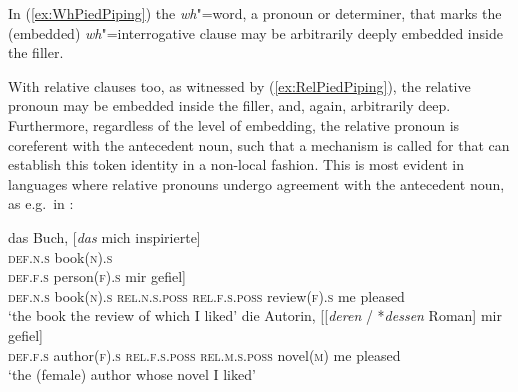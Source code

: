 \documentclass[output=paper
,notxmath 
 	        ,biblatex
                ,babelshorthands
                ,newtxmath
                ,draftmode
                ,colorlinks, citecolor=brown
]{langscibook}
\begin{document}
\begin{exe}
  \ex \label{ex:WhPiedPiping}
  \begin{xlist}
  \end{xlist}
\end{exe}

\begin{exe}
  \ex \label{ex:RelPiedPiping}
  \begin{xlist}
  \end{xlist}
\end{exe}

\noindent
In (\ref{ex:WhPiedPiping}) the \emph{wh}"=word, a pronoun or determiner, that
marks the (embedded) \emph{wh}"=interrogative clause may be arbitrarily deeply embedded inside the filler.  

With relative clauses too, as witnessed by (\ref{ex:RelPiedPiping}), the
relative pronoun may be embedded inside the filler, and, again,
arbitrarily deep. Furthermore, regardless of the level of embedding,
the relative pronoun is coreferent with the antecedent noun, such that
a mechanism is called for that can establish this token identity in a
non-local fashion. This is most evident in languages where relative
pronouns undergo agreement with the antecedent noun, as e.g.\ in
:

\eal
\ex
\gll das Buch, [\textit{das} mich inspirierte]\\
     \textsc{def.n.s} book(\textsc{n})\textsc{.s} \hphantom[\textsc{rel.n.s} me inspired\\
\glt `the book that inspired me'
\ex
\gll die Person, [\textit{die} mich inspirierte]\\
     \textsc{def.f.s} person(\textsc{f})\textsc{.s} \hphantom[\textsc{rel.f.s} me inspired\\   
\glt `the person that inspired me'
\ex
\gll das Buch, [[\textit{dessen} / *\textit{deren} Rezension] mir gefiel]\\
     \textsc{def.n.s} book(\textsc{n})\textsc{.s} \hphantom{[[}\textsc{rel.n.s.poss} {} \hphantom{*}\textsc{rel.f.s.poss} review(\textsc{f}).\textsc{s} me pleased\\
\glt `the book the review of which I liked'
\ex
\gll die Autorin, [[\textit{deren} / *\textit{dessen} Roman] mir gefiel]\\
     \textsc{def.f.s} author(\textsc{f})\textsc{.s} \hphantom{[[}\textsc{rel.f.s.poss} {} \hphantom{*}\textsc{rel.m.s.poss} novel(\textsc{m}) me pleased\\
\glt `the (female) author whose novel I liked'
\zl
\end{document}
